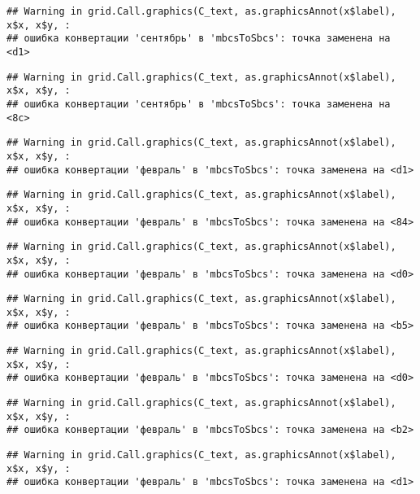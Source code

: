 \documentclass[
]{article}
\begin{document}
\begin{verbatim}
## Warning in grid.Call.graphics(C_text, as.graphicsAnnot(x$label), x$x, x$y, :
## ошибка конвертации 'сентябрь' в 'mbcsToSbcs': точка заменена на <d1>
\end{verbatim}

\begin{verbatim}
## Warning in grid.Call.graphics(C_text, as.graphicsAnnot(x$label), x$x, x$y, :
## ошибка конвертации 'сентябрь' в 'mbcsToSbcs': точка заменена на <8c>
\end{verbatim}

\begin{verbatim}
## Warning in grid.Call.graphics(C_text, as.graphicsAnnot(x$label), x$x, x$y, :
## ошибка конвертации 'февраль' в 'mbcsToSbcs': точка заменена на <d1>
\end{verbatim}

\begin{verbatim}
## Warning in grid.Call.graphics(C_text, as.graphicsAnnot(x$label), x$x, x$y, :
## ошибка конвертации 'февраль' в 'mbcsToSbcs': точка заменена на <84>
\end{verbatim}

\begin{verbatim}
## Warning in grid.Call.graphics(C_text, as.graphicsAnnot(x$label), x$x, x$y, :
## ошибка конвертации 'февраль' в 'mbcsToSbcs': точка заменена на <d0>
\end{verbatim}

\begin{verbatim}
## Warning in grid.Call.graphics(C_text, as.graphicsAnnot(x$label), x$x, x$y, :
## ошибка конвертации 'февраль' в 'mbcsToSbcs': точка заменена на <b5>
\end{verbatim}

\begin{verbatim}
## Warning in grid.Call.graphics(C_text, as.graphicsAnnot(x$label), x$x, x$y, :
## ошибка конвертации 'февраль' в 'mbcsToSbcs': точка заменена на <d0>
\end{verbatim}

\begin{verbatim}
## Warning in grid.Call.graphics(C_text, as.graphicsAnnot(x$label), x$x, x$y, :
## ошибка конвертации 'февраль' в 'mbcsToSbcs': точка заменена на <b2>
\end{verbatim}

\begin{verbatim}
## Warning in grid.Call.graphics(C_text, as.graphicsAnnot(x$label), x$x, x$y, :
## ошибка конвертации 'февраль' в 'mbcsToSbcs': точка заменена на <d1>
\end{verbatim}
\end{document}
